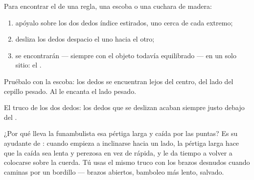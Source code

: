 \begin{method}\label{met:g2:balance-equilibrium:find}
Para encontrar el  de una regla, una escoba o una
cuchara de madera:
\begin{enumerate}
  \item apóyalo sobre los dos dedos índice estirados, uno cerca de
        cada extremo;
  \item desliza los dedos despacio el uno hacia el otro;
  \item se encontrarán --- siempre con el objeto todavía
        equilibrado --- en un solo sitio: el .
\end{enumerate}
Pruébalo con la escoba: los dedos se encuentran lejos del centro, del
lado del cepillo pesado. Al  le encanta el lado
pesado.
\end{method}

\begin{omfigure}

{\small El truco de los dos dedos: los dedos que se deslizan acaban
siempre justo debajo del .}
\end{omfigure}

\begin{example}\label{ex:g2:balance-equilibrium:acrobat}
¿Por qué lleva la funambulista esa pértiga larga y caída por las
puntas? Es su ayudante de : cuando empieza a inclinarse
hacia un lado, la pértiga larga hace que la caída sea lenta y
perezosa en vez de rápida, y le da tiempo a volver a colocarse sobre
la cuerda. Tú usas el mismo truco con los brazos desnudos cuando
caminas por un bordillo --- brazos abiertos, bamboleo más lento,
 salvado.
\end{example}

